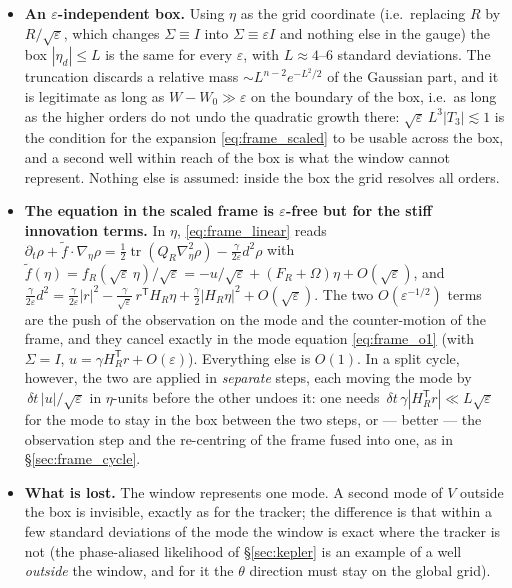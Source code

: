 \documentclass[11pt,a4paper]{article}
\newcommand{\tr}{\operatorname{tr}}
\newcommand{\T}{^{\mathsf T}}
\newcommand{\eps}{\varepsilon}
\newcommand{\abs}[1]{\left\lvert #1 \right\rvert}
\newcommand{\grad}{\nabla}
\newcommand{\dt}{\,\delta t}
\theoremstyle{plain}
\theoremstyle{definition}
\theoremstyle{remark}
\begin{document}
\begin{itemize}[leftmargin=1.5em]
  \item \textbf{An $\eps$-independent box.} Using $\eta$ as the grid coordinate (i.e.\ replacing $R$ by $R/\sqrt\eps$, which changes $\Sigma\equiv I$ into $\Sigma\equiv\eps I$ and nothing else in the gauge) the box $\abs{\eta_d}\le L$ is the same for every $\eps$, with $L\approx4$--$6$ standard deviations. The truncation discards a relative mass $\sim L^{n-2}e^{-L^2/2}$ of the Gaussian part, and it is legitimate as long as $W-W_0\gg\eps$ on the boundary of the box, i.e.\ as long as the higher orders do not undo the quadratic growth there: $\sqrt\eps\,L^3\abs{T_3}\lesssim1$ is the condition for the expansion \eqref{eq:frame_scaled} to be usable across the box, and a second well within reach of the box is what the window cannot represent. Nothing else is assumed: inside the box the grid resolves all orders.
  \item \textbf{The equation in the scaled frame is $\eps$-free but for the stiff innovation terms.} In $\eta$, \eqref{eq:frame_linear} reads $\partial_t\rho + \tilde f\cdot\grad_\eta\rho = \tfrac12\tr(Q_R\grad_\eta^2\rho) - \tfrac{\gamma}{2\eps}d^2\rho$ with $\tilde f(\eta) = f_R(\sqrt\eps\,\eta)/\sqrt\eps = -u/\sqrt\eps + (F_R+\Omega)\eta + O(\sqrt\eps)$, and $\tfrac{\gamma}{2\eps}d^2 = \tfrac{\gamma}{2\eps}\abs r^2 - \tfrac{\gamma}{\sqrt\eps}\,r\T H_R\eta + \tfrac\gamma2\abs{H_R\eta}^2 + O(\sqrt\eps)$. The two $O(\eps^{-1/2})$ terms are the push of the observation on the mode and the counter-motion of the frame, and they cancel exactly in the mode equation \eqref{eq:frame_o1} (with $\Sigma=I$, $u = \gamma H_R\T r + O(\eps)$). Everything else is $O(1)$. In a split cycle, however, the two are applied in \emph{separate} steps, each moving the mode by $\dt\,\abs u/\sqrt\eps$ in $\eta$-units before the other undoes it: one needs $\dt\,\gamma\abs{H_R\T r}\ll L\sqrt\eps$ for the mode to stay in the box between the two steps, or --- better --- the observation step and the re-centring of the frame fused into one, as in \S\ref{sec:frame_cycle}.
  \item \textbf{What is lost.} The window represents one mode. A second mode of $V$ outside the box is invisible, exactly as for the tracker; the difference is that within a few standard deviations of the mode the window is exact where the tracker is not (the phase-aliased likelihood of \S\ref{sec:kepler} is an example of a well \emph{outside} the window, and for it the $\theta$ direction must stay on the global grid).
\end{itemize}
\end{document}
